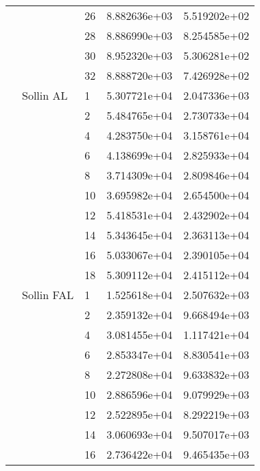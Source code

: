 \begin{tabular}{lllrr}
                      &            & 26 &  8.882636e+03 &  5.519202e+02 \\
                      &            & 28 &  8.886990e+03 &  8.254585e+02 \\
                      &            & 30 &  8.952320e+03 &  5.306281e+02 \\
                      &            & 32 &  8.888720e+03 &  7.426928e+02 \\
                      & Sollin AL & 1  &  5.307721e+04 &  2.047336e+03 \\
                      &            & 2  &  5.484765e+04 &  2.730733e+04 \\
                      &            & 4  &  4.283750e+04 &  3.158761e+04 \\
                      &            & 6  &  4.138699e+04 &  2.825933e+04 \\
                      &            & 8  &  3.714309e+04 &  2.809846e+04 \\
                      &            & 10 &  3.695982e+04 &  2.654500e+04 \\
                      &            & 12 &  5.418531e+04 &  2.432902e+04 \\
                      &            & 14 &  5.343645e+04 &  2.363113e+04 \\
                      &            & 16 &  5.033067e+04 &  2.390105e+04 \\
                      &            & 18 &  5.309112e+04 &  2.415112e+04 \\
                      & Sollin FAL & 1  &  1.525618e+04 &  2.507632e+03 \\
                      &            & 2  &  2.359132e+04 &  9.668494e+03 \\
                      &            & 4  &  3.081455e+04 &  1.117421e+04 \\
                      &            & 6  &  2.853347e+04 &  8.830541e+03 \\
                      &            & 8  &  2.272808e+04 &  9.633832e+03 \\
                      &            & 10 &  2.886596e+04 &  9.079929e+03 \\
                      &            & 12 &  2.522895e+04 &  8.292219e+03 \\
                      &            & 14 &  3.060693e+04 &  9.507017e+03 \\
                      &            & 16 &  2.736422e+04 &  9.465435e+03 \\

\end{tabular}

